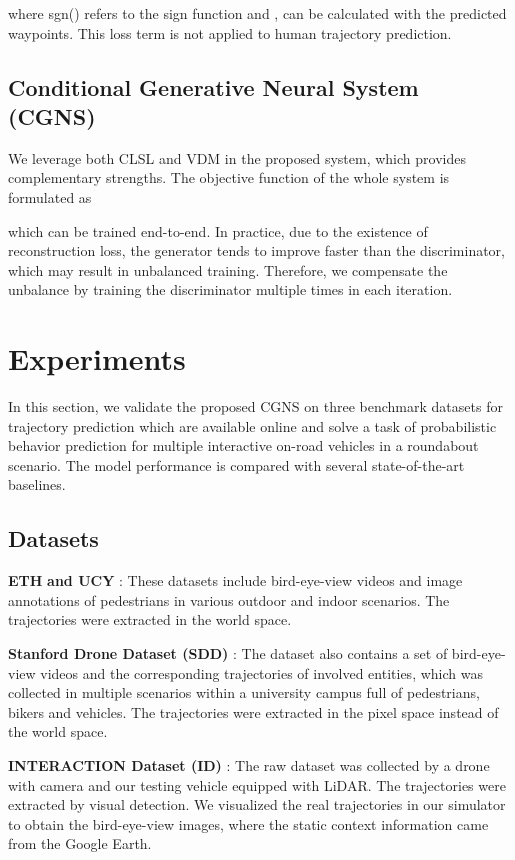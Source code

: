 \documentclass[letterpaper, 10 pt, conference]{ieeeconf}
\begin{document}
where sgn() refers to the sign function and , can be calculated with the predicted waypoints.
This loss term is not applied to human trajectory prediction.

\subsection{Conditional Generative Neural System (CGNS)}
We leverage both CLSL and VDM in the proposed system, which provides complementary strengths.
The objective function of the whole system is formulated as

which can be trained end-to-end.
In practice, due to the existence of reconstruction loss, the generator tends to improve faster than the discriminator, which may result in unbalanced training. Therefore, we compensate the unbalance by training the discriminator multiple times in each iteration.

\section{Experiments}
In this section, we validate the proposed CGNS on three benchmark datasets for trajectory prediction which are available online and solve a task of probabilistic behavior prediction for multiple interactive on-road vehicles in a roundabout scenario. The model performance is compared with several state-of-the-art baselines.

\subsection{Datasets}

\vspace{0.1cm}
\noindent
\textbf{ETH} \cite{ETH_dataset} \textbf{and UCY} \cite{UCY_dataset}: These datasets include bird-eye-view videos and image annotations of pedestrians in various outdoor and indoor scenarios. The trajectories were extracted in the world space.

\vspace{0.1cm}
\noindent
\textbf{Stanford Drone Dataset (SDD)} \cite{A10}: The dataset also contains a set of bird-eye-view videos and the corresponding trajectories of involved entities, which was collected in multiple scenarios within a university campus full of pedestrians, bikers and vehicles. The trajectories were extracted in the pixel space instead of the world space.

\vspace{0.1cm}
\noindent
\textbf{INTERACTION Dataset (ID)} \cite{Wei_IROS19,Wei_INTERACTION_19}: The raw dataset was collected by a drone with camera and our testing vehicle equipped with LiDAR. The trajectories were extracted by visual detection. We visualized the real trajectories in our simulator to obtain the bird-eye-view images, where the static context information came from the Google Earth. 
\end{document}
